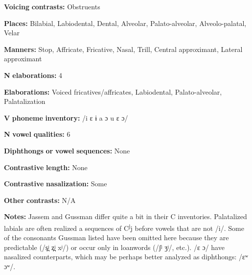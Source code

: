 \begin{styleBody}
\textbf{Voicing} \textbf{contrasts:} Obstruents
\end{styleBody}

\begin{styleBody}
\textbf{Places:} Bilabial, Labiodental, Dental, Alveolar, Palato-alveolar, Alveolo-palatal, Velar
\end{styleBody}

\begin{styleBody}
\textbf{Manners:} Stop, Affricate, Fricative, Nasal, Trill, Central approximant, Lateral approximant
\end{styleBody}

\begin{styleBody}
\textbf{N} \textbf{elaborations:} 4
\end{styleBody}

\begin{styleBody}
\textbf{Elaborations:} Voiced fricatives/affricates, Labiodental, Palato-alveolar, Palatalization
\end{styleBody}

\begin{styleBody}
\textbf{V} \textbf{phoneme} \textbf{inventory:} /i ɛ ɨ a ɔ u ɛ ɔ/
\end{styleBody}

\begin{styleBody}
\textbf{N} \textbf{vowel} \textbf{qualities:} 6
\end{styleBody}

\begin{styleBody}
\textbf{Diphthongs} \textbf{or} \textbf{vowel} \textbf{sequences:} None
\end{styleBody}

\begin{styleBody}
\textbf{Contrastive} \textbf{length:} None
\end{styleBody}

\begin{styleBody}
\textbf{Contrastive} \textbf{nasalization:} Some
\end{styleBody}

\begin{styleBody}
\textbf{Other} \textbf{contrasts:} N/A
\end{styleBody}

\begin{styleBody}
\textbf{Notes:} Jassem and Gussman differ quite a bit in their C inventories. Palatalized labials are often realized a sequences of C\textsuperscript{j}j before vowels that are not /i/. Some of the consonants Gussman listed have been omitted here because they are predictable (/s̪ʲ z̪ʲ xʲ/) or occur only in loanwords (/ʃʲ ʒʲ/, etc.). /ɛ ɔ/ have nasalized counterparts, which may be perhaps better analyzed as diphthongs: /ɛʷ ɔʷ/.
\end{styleBody}

